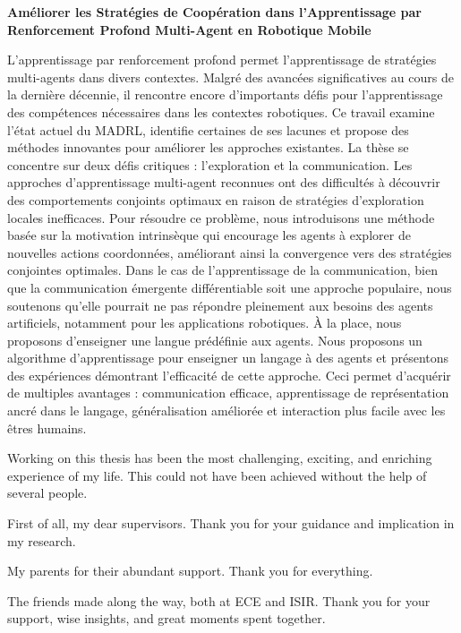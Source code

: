 \documentclass[
11pt, %
english, %
singlespacing, %
parskip, %
headsepline, %
]{MastersDoctoralThesis} %
\begin{document}
\begin{FrenchAbstract}
\textbf{Améliorer les Stratégies de Coopération dans l'Apprentissage par Renforcement Profond Multi-Agent en Robotique Mobile}

L'apprentissage par renforcement profond permet l'apprentissage de stratégies multi-agents dans divers contextes. Malgré des avancées significatives au cours de la dernière décennie, il rencontre encore d'importants défis pour l'apprentissage des compétences nécessaires dans les contextes robotiques. Ce travail examine l'état actuel du MADRL, identifie certaines de ses lacunes et propose des méthodes innovantes pour améliorer les approches existantes. La thèse se concentre sur deux défis critiques : l'exploration et la communication. Les approches d'apprentissage multi-agent reconnues ont des difficultés à découvrir des comportements conjoints optimaux en raison de stratégies d'exploration locales inefficaces. Pour résoudre ce problème, nous introduisons une méthode basée sur la motivation intrinsèque qui encourage les agents à explorer de nouvelles actions coordonnées, améliorant ainsi la convergence vers des stratégies conjointes optimales. Dans le cas de l'apprentissage de la communication, bien que la communication émergente différentiable soit une approche populaire, nous soutenons qu'elle pourrait ne pas répondre pleinement aux besoins des agents artificiels, notamment pour les applications robotiques. À la place, nous proposons d'enseigner une langue prédéfinie aux agents. Nous proposons un algorithme d'apprentissage pour enseigner un langage à des agents et présentons des expériences démontrant l'efficacité de cette approche. Ceci permet d'acquérir de multiples avantages : communication efficace, apprentissage de représentation ancré dans le langage, généralisation améliorée et interaction plus facile avec les êtres humains. 
\end{FrenchAbstract}


\begin{Acknowledgements}
Working on this thesis has been the most challenging, exciting, and enriching experience of my life. This could not have been achieved without the help of several people. 

First of all, my dear supervisors. Thank you for your guidance and implication in my research. 

My parents for their abundant support. Thank you for everything.

The friends made along the way, both at ECE and ISIR. Thank you for your support, wise insights, and great moments spent together. 
\end{Acknowledgements}
\end{document}
